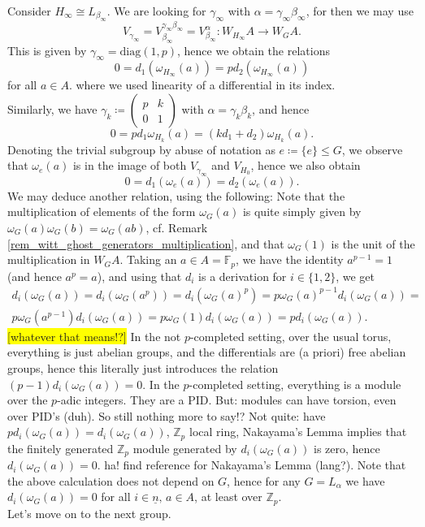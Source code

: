\documentclass[10pt, a4paper, UKenglish]{article}
\numberwithin{equation}{section}
\newcommand{\bF}{\mathbb{F}}
\newcommand{\bZ}{\mathbb{Z}}
\newcommand{\defas}{\coloneqq}  %
\newcommand{\ind}[1]{\underline{#1}}
\newcommand{\diag}{\mathrm{diag}}
\newcommand{\comm}[1]{\colorbox{yellow}{#1}}
\newcommand{\inmatrixtwo}[4]{\left( \begin{smallmatrix} #1 & #2 \\ #3 & #4 \end{smallmatrix} \right)}
\theoremstyle{plain}
\theoremstyle{definition}
\renewcommand{\to}{\longrightarrow}
\begin{document}
Consider $H_\infty \cong L_{\beta_\infty}$. We are looking for $\gamma_\infty$ with $\alpha = \gamma_\infty\beta_\infty$, for then we may use
\begin{equation*}
	V_{\gamma_\infty} = V_{\beta_\infty}^{\gamma_\infty\beta_\infty} = %
	V_{\beta_\infty}^{\alpha}: W_{H_\infty} A \to W_G A.
\end{equation*}
This is given by $\gamma_\infty = \diag(1,p)$, hence we obtain the relations
\begin{equation}\label{eq_group_diag(p,p)_subgroup_diag(1,p)}
	0 = d_1(\omega_{H_\infty}(a)) = p d_2 (\omega_{H_\infty}(a))
\end{equation}
for all $a \in A$. where we used linearity of a differential in its index.\\
Similarly, we have $\gamma_k \defas \inmatrixtwo{p}{k}{0}{1}$ with $\alpha = \gamma_k \beta_k$, and hence
\begin{equation}\label{eq_group_diag(p,p)_subgroup_(p,k_0,1)}
	0 = p d_1  \omega_{H_k}(a) = (k d_1 + d_2) \omega_{H_k}(a).
\end{equation}
Denoting the trivial subgroup by abuse of notation as $e \defas \{e\} \leq G$, we observe that $\omega_e(a)$ is in the image of both $V_{\gamma_\infty}$ and $V_{H_0}$, hence we also obtain
\begin{equation*}
	0 = d_1(\omega_e(a)) = d_2 (\omega_e(a)).
\end{equation*}
We may deduce another relation, using the following: Note that the multiplication of elements of the form $\omega_G(a)$ is quite simply given by $\omega_G (a) \omega_G (b) = \omega_G (ab)$, cf. Remark \ref{rem_witt_ghost_generators_multiplication}, and that $\omega_G(1)$ is the unit of the multiplication in $W_G A$. Taking an $a \in A = \bF_p$, we have the identity $a^{p-1} = 1$ (and hence $a^p=a$), and using that $d_i$ is a derivation for $i \in \{1,2\}$, we get
\begin{gather*}
	d_i(\omega_G(a)) = d_i(\omega_G(a^p)) = d_i(\omega_G(a)^p) = p \omega_G(a)^{p-1} d_i(\omega_G(a)) = \\ %
	p \omega_G(a^{p-1}) d_i(\omega_G(a)) = p \omega_G(1) d_i(\omega_G(a)) = p d_i(\omega_G(a)). %
\end{gather*}
\comm{[whatever that means!?]} In the not $p$-completed setting, over the usual torus, everything is just abelian groups, and the differentials are (a priori) free abelian groups, hence this literally just introduces the relation $(p-1)d_i (\omega_G(a)) = 0$. In the $p$-completed setting, everything is a module over the $p$-adic integers. They are a PID. But: modules can have torsion, even over PID's (duh). So still nothing more to say!? Not quite: have $p d_i (\omega_G(a)) = d_i (\omega_G(a))$, $\bZ_p$ local ring, Nakayama's Lemma implies that the finitely generated $\bZ_p$ module generated by $d_i (\omega_G(a))$ is zero, hence $d_i (\omega_G(a)) = 0$. ha! find reference for Nakayama's Lemma (lang?). Note that the above calculation does not depend on $G$, hence for any $G = L_\alpha$ we have $d_i(\omega_G(a)) = 0$ for all $i\in \ind{n},\, a \in A$, at least over $\bZ_p$.\\
Let's move on to the next group.


\end{document}
